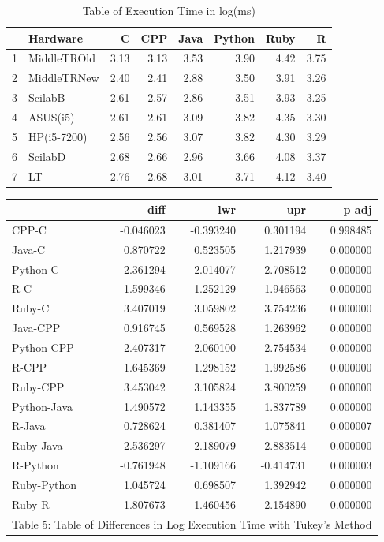 \documentclass[12pt,halfline,a4paper,]{ouparticle}
\begin{document}
\begin{table}[ht]
\centering
\begin{tabular}{rlrrrrrr}
  \hline
 & Hardware & C & CPP & Java & Python & Ruby & R \\ 
  \hline
1 & MiddleTROld & 3.13 & 3.13 & 3.53 & 3.90 & 4.42 & 3.75 \\ 
  2 & MiddleTRNew & 2.40 & 2.41 & 2.88 & 3.50 & 3.91 & 3.26 \\ 
  3 & ScilabB & 2.61 & 2.57 & 2.86 & 3.51 & 3.93 & 3.25 \\ 
  4 & ASUS(i5) & 2.61 & 2.61 & 3.09 & 3.82 & 4.35 & 3.30 \\ 
  5 & HP(i5-7200) & 2.56 & 2.56 & 3.07 & 3.82 & 4.30 & 3.29 \\ 
  6 & ScilabD & 2.68 & 2.66 & 2.96 & 3.66 & 4.08 & 3.37 \\ 
  7 & LT & 2.76 & 2.68 & 3.01 & 3.71 & 4.12 & 3.40 \\ 
   \hline
\end{tabular}
\caption{Table of Execution Time in log(ms)} 
\end{table}
\begingroup\fontsize{9}{11}\selectfont

\begin{longtable}[t]{lrrrr}
\toprule
 & diff & lwr & upr & p adj\\
\midrule
CPP-C & -0.046023 & -0.393240 & 0.301194 & 0.998485\\
Java-C & 0.870722 & 0.523505 & 1.217939 & 0.000000\\
Python-C & 2.361294 & 2.014077 & 2.708512 & 0.000000\\
R-C & 1.599346 & 1.252129 & 1.946563 & 0.000000\\
Ruby-C & 3.407019 & 3.059802 & 3.754236 & 0.000000\\
\addlinespace
Java-CPP & 0.916745 & 0.569528 & 1.263962 & 0.000000\\
Python-CPP & 2.407317 & 2.060100 & 2.754534 & 0.000000\\
R-CPP & 1.645369 & 1.298152 & 1.992586 & 0.000000\\
Ruby-CPP & 3.453042 & 3.105824 & 3.800259 & 0.000000\\
Python-Java & 1.490572 & 1.143355 & 1.837789 & 0.000000\\
\addlinespace
R-Java & 0.728624 & 0.381407 & 1.075841 & 0.000007\\
Ruby-Java & 2.536297 & 2.189079 & 2.883514 & 0.000000\\
R-Python & -0.761948 & -1.109166 & -0.414731 & 0.000003\\
Ruby-Python & 1.045724 & 0.698507 & 1.392942 & 0.000000\\
Ruby-R & 1.807673 & 1.460456 & 2.154890 & 0.000000\\
\bottomrule
\multicolumn{5}{l}{\rule{0pt}{1em}Table 5: Table of Differences in Log Execution Time with Tukey's Method}\\
\end{longtable}
\endgroup{}
\end{document}
